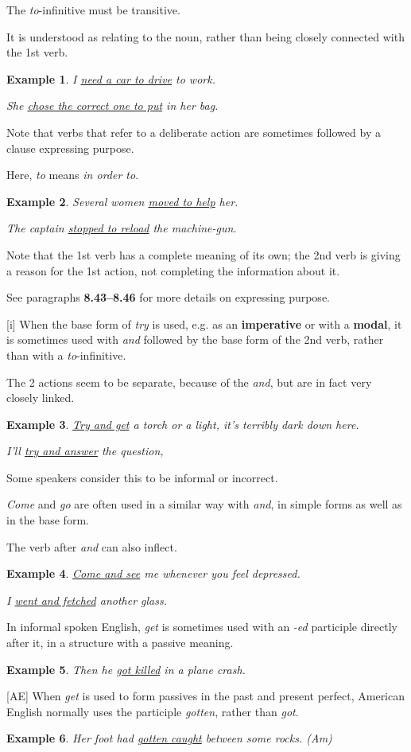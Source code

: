 \documentclass[oneside]{book}
\numberwithin{equation}{section}
\newtheorem{example}{Example}[section]
\begin{document}
The \textit{to}-infinitive must be transitive.

It is understood as relating to the noun, rather than being closely connected with the 1st verb.
\begin{example}
    I \underline{need a car to drive} to work.
    
    She \underline{chose the correct one to put} in her bag.
\end{example}
%
\noindent{} Note that verbs that refer to a deliberate action are sometimes followed by a clause expressing purpose.

Here, \textit{to} means \textit{in order to}.
\begin{example}
    Several women \underline{moved to help} her.
    
    The captain \underline{stopped to reload} the machine-gun.
\end{example}
Note that the 1st verb has a complete meaning of its own; the 2nd verb is giving a reason for the 1st action, not completing the information about it.

%
See paragraphs \textbf{8.43--8.46} for more details on expressing purpose.

%
\noindent{} [i] When the base form of \textit{try} is used, e.g. as an \textbf{imperative} or with a \textbf{modal}, it is sometimes used with \textit{and} followed by the base form of the 2nd verb, rather than with a \textit{to}-infinitive.

The 2 actions seem to be separate, because of the \textit{and}, but are in fact very closely linked.
\begin{example}
    \underline{Try and get} a torch or a light, it's terribly dark down here.
    
    I'll \underline{try and answer} the question,
\end{example}
Some speakers consider this to be informal or incorrect.

%
\textit{Come} and \textit{go} are often used in a similar way with \textit{and}, in simple forms as well as in the base form.

The verb after \textit{and} can also inflect.
\begin{example}
    \underline{Come and see} me whenever you feel depressed.
    
    I \underline{went and fetched} another glass.
\end{example}
%
\noindent{} In informal spoken English, \textit{get} is sometimes used with an \textit{-ed} participle directly after it, in a structure with a passive meaning.
\begin{example}
    Then he \underline{got killed} in a plane crash.
\end{example}
[AE] When \textit{get} is used to form passives in the past and present perfect, American English normally uses the participle \textit{gotten}, rather than \textit{got}.
\begin{example}
    Her foot had \underline{gotten caught} between some rocks. (Am)
\end{example}
\end{document}
